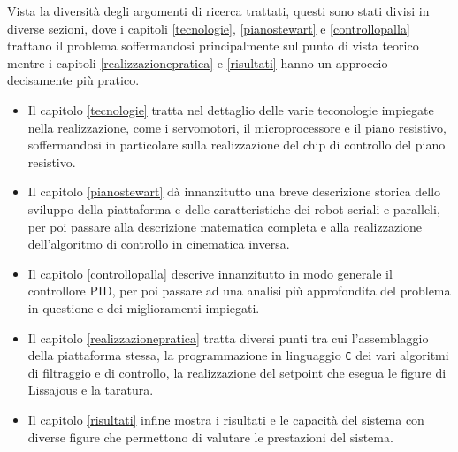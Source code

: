 \documentclass[12pt,twoside,openright]{report}
\begin{document}
Vista la diversità degli argomenti di ricerca trattati, questi sono stati divisi in diverse sezioni, dove i capitoli \ref{tecnologie}, \ref{pianostewart} e \ref{controllopalla} trattano il problema soffermandosi principalmente sul punto di vista teorico mentre i capitoli \ref{realizzazionepratica} e \ref{risultati} hanno un approccio decisamente più pratico. 
\begin{itemize}
\item Il capitolo \ref{tecnologie} tratta nel dettaglio delle varie teconologie impiegate nella realizzazione, come i servomotori, il microprocessore e il piano resistivo, soffermandosi in particolare sulla realizzazione del chip di controllo del piano resistivo. 
\item Il capitolo \ref{pianostewart} dà innanzitutto una breve descrizione storica dello sviluppo della piattaforma e delle caratteristiche dei robot seriali e paralleli, per poi passare alla descrizione matematica completa e alla realizzazione dell'algoritmo di controllo in cinematica inversa. 
\item Il capitolo \ref{controllopalla} descrive innanzitutto in modo generale il controllore PID, per poi passare ad una analisi più approfondita del problema in questione e dei miglioramenti impiegati. 
\item Il capitolo \ref{realizzazionepratica} tratta diversi punti tra cui l'assemblaggio della piattaforma stessa, la programmazione in linguaggio \texttt{C} dei vari algoritmi di filtraggio e di controllo, la realizzazione del setpoint che esegua le figure di Lissajous e la taratura. 
\item Il capitolo \ref{risultati} infine mostra i risultati e le capacità del sistema con diverse figure che permettono di valutare le prestazioni del sistema.
\end{itemize}

\end{document}
